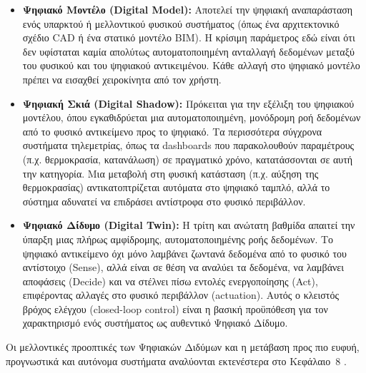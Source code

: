 \begin{itemize}
\item \textbf{Ψηφιακό Μοντέλο (\textlatin{Digital Model}):} Αποτελεί την ψηφιακή αναπαράσταση ενός υπαρκτού ή μελλοντικού φυσικού συστήματος (όπως ένα αρχιτεκτονικό σχέδιο \textlatin{CAD} ή ένα στατικό μοντέλο \textlatin{BIM}). Η κρίσιμη παράμετρος εδώ είναι ότι δεν υφίσταται καμία απολύτως αυτοματοποιημένη ανταλλαγή δεδομένων μεταξύ του φυσικού και του ψηφιακού αντικειμένου. Κάθε αλλαγή στο ψηφιακό μοντέλο πρέπει να εισαχθεί χειροκίνητα από τον χρήστη.
\item \textbf{Ψηφιακή Σκιά (\textlatin{Digital Shadow}):} Πρόκειται για την εξέλιξη του ψηφιακού μοντέλου, όπου εγκαθιδρύεται μια αυτοματοποιημένη, μονόδρομη ροή δεδομένων από το φυσικό αντικείμενο προς το ψηφιακό. Τα περισσότερα σύγχρονα συστήματα τηλεμετρίας, όπως τα \textlatin{dashboards} που παρακολουθούν παραμέτρους (π.χ. θερμοκρασία, κατανάλωση) σε πραγματικό χρόνο, κατατάσσονται σε αυτή την κατηγορία. Μια μεταβολή στη φυσική κατάσταση (π.χ. αύξηση της θερμοκρασίας) αντικατοπτρίζεται αυτόματα στο ψηφιακό ταμπλό, αλλά το σύστημα αδυνατεί να επιδράσει αντίστροφα στο φυσικό περιβάλλον.
\item \textbf{Ψηφιακό Δίδυμο (\textlatin{Digital Twin}):} Η τρίτη και ανώτατη βαθμίδα απαιτεί την ύπαρξη μιας πλήρως αμφίδρομης, αυτοματοποιημένης ροής δεδομένων. Το ψηφιακό αντικείμενο όχι μόνο λαμβάνει ζωντανά δεδομένα από το φυσικό του αντίστοιχο (\textlatin{Sense}), αλλά είναι σε θέση να αναλύει τα δεδομένα, να λαμβάνει αποφάσεις (\textlatin{Decide}) και να στέλνει πίσω εντολές ενεργοποίησης (\textlatin{Act}), επιφέροντας αλλαγές στο φυσικό περιβάλλον (\textlatin{actuation}). Αυτός ο κλειστός βρόχος ελέγχου (\textlatin{closed-loop control}) είναι η βασική προϋπόθεση για τον χαρακτηρισμό ενός συστήματος ως αυθεντικό Ψηφιακό Δίδυμο.
\end{itemize}

Οι μελλοντικές προοπτικές των Ψηφιακών Διδύμων και η μετάβαση προς πιο ευφυή, προγνωστικά και αυτόνομα συστήματα αναλύονται εκτενέστερα στο Κεφάλαιο~8 \cite{Han2022, Kritzinger2018, Semeraro2021}.

